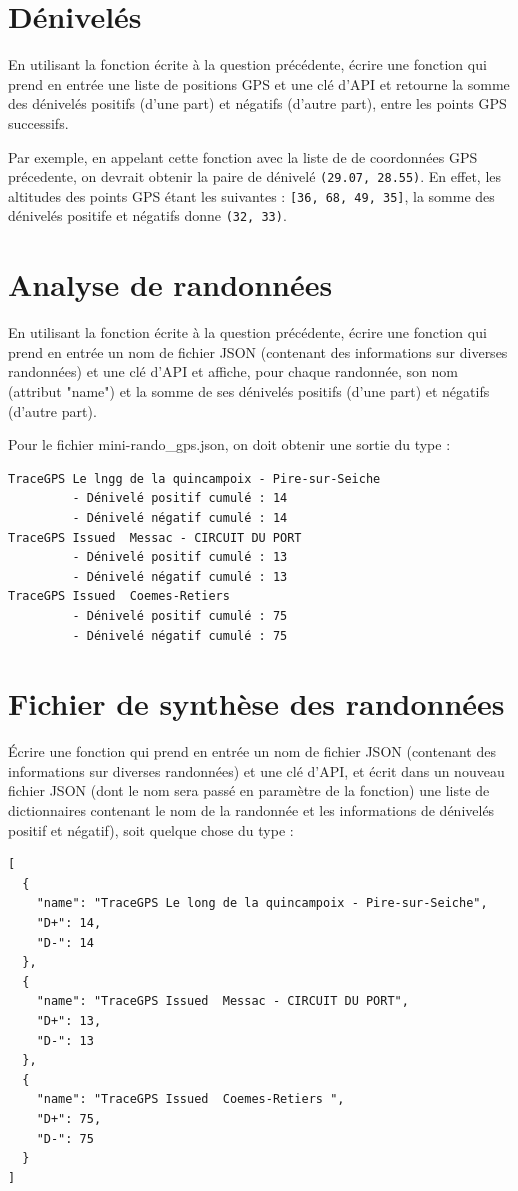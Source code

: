 \documentclass[11pt,a4paper]{article}
\begin{document}
\section{Dénivelés}

En utilisant la fonction écrite à la question précédente, écrire
une fonction qui prend en entrée une liste de positions GPS et une clé d'API et retourne la somme des dénivelés positifs (d’une part) et négatifs (d’autre part), entre les points GPS successifs. 

Par exemple, en appelant cette fonction avec la liste de de coordonnées GPS précedente, on devrait obtenir la paire de dénivelé \verb+(29.07, 28.55)+.
En effet, les altitudes des points GPS étant les suivantes :
\verb+[36, 68, 49, 35]+,  la somme des dénivelés positife et négatifs donne \verb+(32, 33)+.

\section{Analyse de randonnées}

En utilisant la fonction écrite à la question précédente, écrire une fonction qui prend en entrée un nom de fichier JSON (contenant des informations sur diverses randonnées) et une clé d'API et affiche, pour chaque randonnée, son nom (attribut "name") et la somme de ses dénivelés positifs (d’une part) et négatifs (d’autre part). 

Pour le fichier mini-rando\_gps.json, on doit obtenir une sortie du type :
\begin{verbatim}
TraceGPS Le lngg de la quincampoix - Pire-sur-Seiche 
         - Dénivelé positif cumulé : 14
         - Dénivelé négatif cumulé : 14
TraceGPS Issued  Messac - CIRCUIT DU PORT 
         - Dénivelé positif cumulé : 13
         - Dénivelé négatif cumulé : 13
TraceGPS Issued  Coemes-Retiers  
         - Dénivelé positif cumulé : 75
         - Dénivelé négatif cumulé : 75
\end{verbatim}
\section{Fichier de synthèse des randonnées}

Écrire une fonction qui prend en entrée un nom de fichier JSON (contenant des informations sur diverses randonnées) et une clé d'API, et écrit dans un nouveau fichier JSON (dont le nom sera passé en paramètre de la fonction) une liste de dictionnaires contenant le nom de la randonnée et les informations de dénivelés positif et négatif), soit quelque chose du type :
\begin{verbatim}
[
  {
    "name": "TraceGPS Le long de la quincampoix - Pire-sur-Seiche",
    "D+": 14,
    "D-": 14
  },
  {
    "name": "TraceGPS Issued  Messac - CIRCUIT DU PORT",
    "D+": 13,
    "D-": 13
  },
  {
    "name": "TraceGPS Issued  Coemes-Retiers ",
    "D+": 75,
    "D-": 75
  }
]
\end{verbatim}
\end{document}
